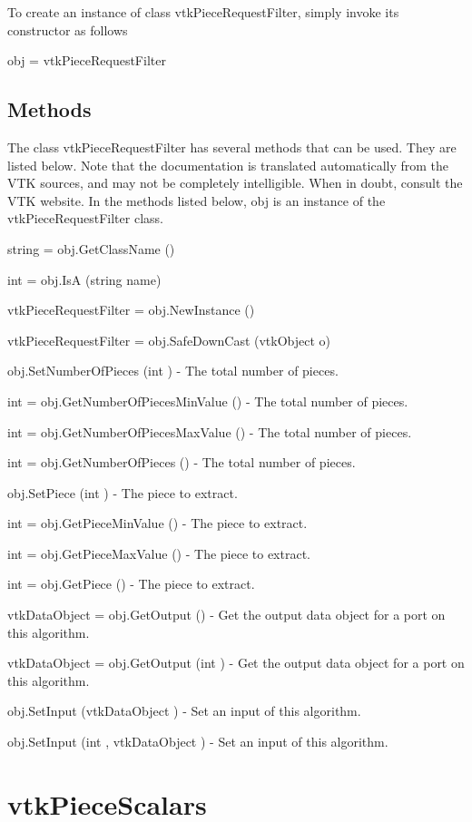 To create an instance of class vtk\-Piece\-Request\-Filter, simply invoke its constructor as follows \begin{DoxyVerb}  obj = vtkPieceRequestFilter
\end{DoxyVerb}
 \hypertarget{vtkwidgets_vtkxyplotwidget_Methods}{}\subsection{Methods}\label{vtkwidgets_vtkxyplotwidget_Methods}
The class vtk\-Piece\-Request\-Filter has several methods that can be used. They are listed below. Note that the documentation is translated automatically from the V\-T\-K sources, and may not be completely intelligible. When in doubt, consult the V\-T\-K website. In the methods listed below, {\ttfamily obj} is an instance of the vtk\-Piece\-Request\-Filter class. 
\begin{DoxyItemize}
\item {\ttfamily string = obj.\-Get\-Class\-Name ()}  
\item {\ttfamily int = obj.\-Is\-A (string name)}  
\item {\ttfamily vtk\-Piece\-Request\-Filter = obj.\-New\-Instance ()}  
\item {\ttfamily vtk\-Piece\-Request\-Filter = obj.\-Safe\-Down\-Cast (vtk\-Object o)}  
\item {\ttfamily obj.\-Set\-Number\-Of\-Pieces (int )} -\/ The total number of pieces.  
\item {\ttfamily int = obj.\-Get\-Number\-Of\-Pieces\-Min\-Value ()} -\/ The total number of pieces.  
\item {\ttfamily int = obj.\-Get\-Number\-Of\-Pieces\-Max\-Value ()} -\/ The total number of pieces.  
\item {\ttfamily int = obj.\-Get\-Number\-Of\-Pieces ()} -\/ The total number of pieces.  
\item {\ttfamily obj.\-Set\-Piece (int )} -\/ The piece to extract.  
\item {\ttfamily int = obj.\-Get\-Piece\-Min\-Value ()} -\/ The piece to extract.  
\item {\ttfamily int = obj.\-Get\-Piece\-Max\-Value ()} -\/ The piece to extract.  
\item {\ttfamily int = obj.\-Get\-Piece ()} -\/ The piece to extract.  
\item {\ttfamily vtk\-Data\-Object = obj.\-Get\-Output ()} -\/ Get the output data object for a port on this algorithm.  
\item {\ttfamily vtk\-Data\-Object = obj.\-Get\-Output (int )} -\/ Get the output data object for a port on this algorithm.  
\item {\ttfamily obj.\-Set\-Input (vtk\-Data\-Object )} -\/ Set an input of this algorithm.  
\item {\ttfamily obj.\-Set\-Input (int , vtk\-Data\-Object )} -\/ Set an input of this algorithm.  
\end{DoxyItemize}\hypertarget{vtkparallel_vtkpiecescalars}{}\section{vtk\-Piece\-Scalars}\label{vtkparallel_vtkpiecescalars}
